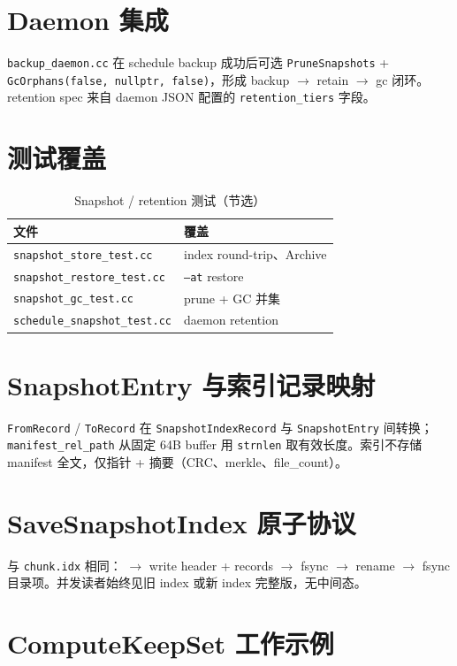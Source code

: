 \section{Daemon 集成}

\texttt{backup\_daemon.cc} 在 schedule backup 成功后可选 \texttt{PruneSnapshots} + \texttt{GcOrphans(false, nullptr, false)}，形成 backup $\rightarrow$ retain $\rightarrow$ gc 闭环。retention spec 来自 daemon JSON 配置的 \texttt{retention\_tiers} 字段。

\section{测试覆盖}

\begin{table}[htbp]
\centering
\caption{Snapshot / retention 测试（节选）}
\begin{tabular}{@{}ll@{}}
\toprule
文件 & 覆盖 \\
\midrule
\texttt{snapshot\_store\_test.cc} & index round-trip、Archive \\
\texttt{snapshot\_restore\_test.cc} & \texttt{--at} restore \\
\texttt{snapshot\_gc\_test.cc} & prune + GC 并集 \\
\texttt{schedule\_snapshot\_test.cc} & daemon retention \\
\bottomrule
\end{tabular}
\end{table}

\section{SnapshotEntry 与索引记录映射}

\texttt{FromRecord} / \texttt{ToRecord} 在 \texttt{SnapshotIndexRecord} 与 \texttt{SnapshotEntry} 间转换；\texttt{manifest\_rel\_path} 从固定 64B buffer 用 \texttt{strnlen} 取有效长度。索引不存储 manifest 全文，仅指针 + 摘要（CRC、merkle、file\_count）。

\section{SaveSnapshotIndex 原子协议}

与 \texttt{chunk.idx} 相同： $\rightarrow$ write header + records $\rightarrow$ fsync $\rightarrow$ rename $\rightarrow$ fsync 目录项。并发读者始终见旧 index 或新 index 完整版，无中间态。

\section{ComputeKeepSet 工作示例}

